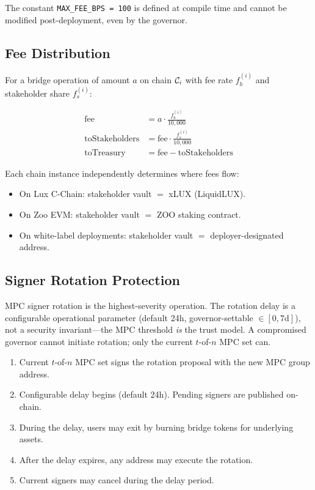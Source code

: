 \noindent
The constant \texttt{MAX\_FEE\_BPS = 100} is defined at compile time and cannot be modified post-deployment, even by the governor.

\subsection{Fee Distribution}

For a bridge operation of amount $a$ on chain $\mathcal{C}_i$ with fee rate $f_b^{(i)}$ and stakeholder share $f_s^{(i)}$:

\begin{align}
  \text{fee} &= a \cdot \frac{f_b^{(i)}}{10{,}000} \\
  \text{toStakeholders} &= \text{fee} \cdot \frac{f_s^{(i)}}{10{,}000} \\
  \text{toTreasury} &= \text{fee} - \text{toStakeholders}
\end{align}

Each chain instance independently determines where fees flow:
\begin{itemize}[nosep]
  \item On Lux C-Chain: stakeholder vault $=$ xLUX (LiquidLUX).
  \item On Zoo EVM: stakeholder vault $=$ ZOO staking contract.
  \item On white-label deployments: stakeholder vault $=$ deployer-designated address.
\end{itemize}

\subsection{Signer Rotation Protection}

MPC signer rotation is the highest-severity operation. The rotation delay is a configurable operational parameter (default 24h, governor-settable $\in [0, 7\text{d}]$), not a security invariant---the MPC threshold \emph{is} the trust model. A compromised governor cannot initiate rotation; only the current $t$-of-$n$ MPC set can.

\begin{enumerate}[nosep]
  \item Current $t$-of-$n$ MPC set signs the rotation proposal with the new MPC group address.
  \item Configurable delay begins (default 24h). Pending signers are published on-chain.
  \item During the delay, users may exit by burning bridge tokens for underlying assets.
  \item After the delay expires, any address may execute the rotation.
  \item Current signers may cancel during the delay period.
\end{enumerate}


